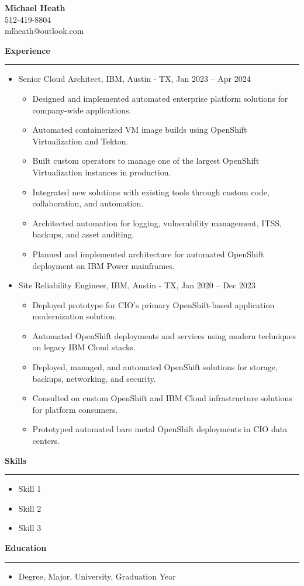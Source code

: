 \documentclass[11pt,a4paper]{article}
\makeatletter
\def\name{Michael Heath}
\def\phone{512-419-8804}
\def\email{mlheath@outlook.com}
\newcommand{\heading}[1]{%
    \vspace{2ex}%
    \noindent\textbf{\large{#1}}\\%
    \noindent\rule{\textwidth}{0.4pt}%
    \vspace{1ex}%
}
\makeatother
\begin{document}
\begin{center}
    {\huge\textbf{\name}}\\
    {\small\phone \\ \email}
\end{center}

\heading{Experience}
\begin{itemize}
    \item Senior Cloud Architect, IBM, Austin - TX, Jan 2023 -- Apr 2024
    \begin{itemize}
        \item Designed and implemented automated enterprise platform solutions for company-wide applications.
        \item Automated containerized VM image builds using OpenShift Virtualization and Tekton.
        \item Built custom operators to manage one of the largest OpenShift Virtualization instances in production.
        \item Integrated new solutions with existing tools through custom code, collaboration, and automation.
        \item Architected automation for logging, vulnerability management, ITSS, backups, and asset auditing.
        \item Planned and implemented architecture for automated OpenShift deployment on IBM Power mainframes.
    \end{itemize}
\end{itemize}

\begin{itemize}
    \item Site Reliability Engineer, IBM, Austin - TX, Jan 2020 -- Dec 2023
    \begin{itemize}
        \item Deployed prototype for CIO's primary OpenShift-based application modernization solution.
        \item Automated OpenShift deployments and services using modern techniques on legacy IBM Cloud stacks.
        \item Deployed, managed, and automated OpenShift solutions for storage, backups, networking, and security.
        \item Consulted on custom OpenShift and IBM Cloud infrastructure solutions for platform consumers.
        \item Prototyped automated bare metal OpenShift deployments in CIO data centers.
    \end{itemize}
\end{itemize}

\heading{Skills}
\begin{itemize}
    \item Skill 1
    \item Skill 2
    \item Skill 3
\end{itemize}

\heading{Education}
\begin{itemize}
    \item Degree, Major, University, Graduation Year
\end{itemize}
\end{document}
